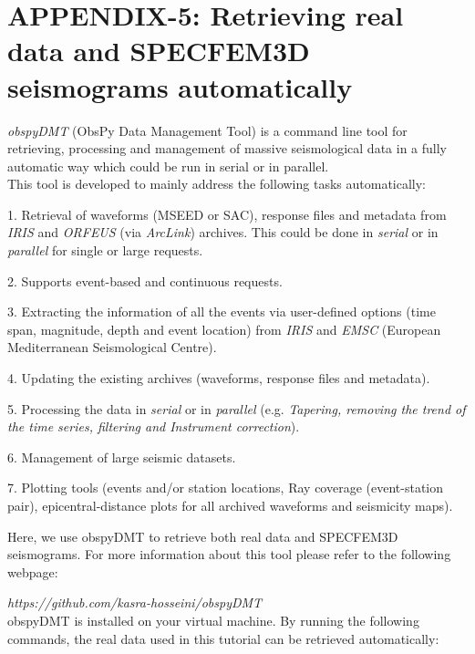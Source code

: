 \documentclass{article}
\begin{document}
\baselineskip=13pt
\leftskip=0pt

\newpage
\section{APPENDIX-5: Retrieving real data and SPECFEM3D seismograms automatically}

{\color{color18} \emph{obspyDMT}} (ObsPy Data Management Tool) is a command line 
tool for retrieving, processing and management of massive seismological data in 
a fully automatic way which could be run in serial or in parallel. \\

This tool is developed to mainly address the following tasks automatically:

1. Retrieval of waveforms (MSEED or SAC), response files and metadata from {\color{color18} \emph{IRIS}} 
and {\color{color18} \emph{ORFEUS}} (via {\color{color18} \emph{ArcLink}}) archives. 
This could be done in \textit{serial} or in \textit{parallel} for single or large 
requests.

2. Supports event-based and continuous requests.

3. Extracting the information of all the events via user-defined options (time 
span, magnitude, depth and event location) from {\color{color18} \emph{IRIS}} and 
{\color{color18} \emph{EMSC}} (European Mediterranean Seismological Centre).

4. Updating the existing archives (waveforms, response files and metadata).

5. Processing the data in \textit{serial} or in \textit{parallel} (e.g. \textit{Tapering, 
removing the trend of the time series, filtering and Instrument correction}).

6. Management of large seismic datasets.

7. Plotting tools (events and/or station locations, Ray coverage (event-station 
pair), epicentral-distance plots for all archived waveforms and seismicity maps).

\vspace{13pt}
Here, we use obspyDMT to retrieve both real data and SPECFEM3D seismograms. For 
more information about this tool please refer to the following webpage:

{\color{color18} \emph{https://github.com/kasra-hosseini/obspyDMT}}  \\

obspyDMT is installed on your virtual machine. By running the following commands, 
the real data used in this tutorial can be retrieved automatically:
\end{document}
